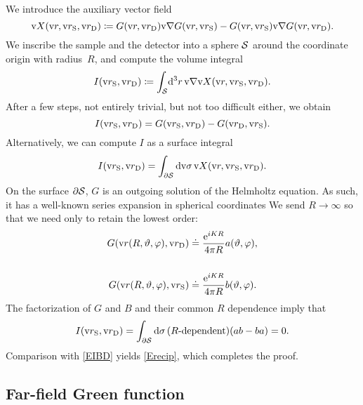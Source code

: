 We introduce the auxiliary vector field
\begin{equation}
  \text{v}{X}(\text{v}{r},\text{v}{r}_\text{S},\text{v}{r}_\text{D})\coloneqq G(\text{v}{r},\text{v}{r}_\text{D})\text{v}{\nabla} G(\text{v}{r},\text{v}{r}_\text{S}) - G(\text{v}{r},\text{v}{r}_\text{S})\text{v}{\nabla} G(\text{v}{r},\text{v}{r}_\text{D}).
\end{equation}
We inscribe the sample and the detector
into a sphere $\mathcal{S}$ around the coordinate origin with radius~$R$,
and compute the volume integral
\begin{equation}\label{Eprerecipro}
    I(\text{v}{r}_\text{S},\text{v}{r}_\text{D}) \coloneqq \displaystyle\int_{\mathcal{S}}\!\mathrm d^3r\,\text{v}{\nabla} \text{v}{X}(\text{v}{r},\text{v}{r}_\text{S},\text{v}{r}_\text{D}).
\end{equation}
After a few steps, not entirely trivial, but not too difficult either,
we obtain
\begin{equation}\label{EIBD}
  I(\text{v}{r}_\text{S},\text{v}{r}_\text{D}) = G(\text{v}{r}_\text{S},\text{v}{r}_\text{D}) - G(\text{v}{r}_\text{D},\text{v}{r}_\text{S}).
\end{equation}
Alternatively, we can compute $I$ as a surface integral
\begin{equation}
  I(\text{v}{r}_\text{S},\text{v}{r}_\text{D})
  =\displaystyle\int_{\partial\mathcal{S}}\mathrm d\text{v}{\sigma}\,\text{v}{X}(\text{v}{r},\text{v}{r}_\text{S},\text{v}{r}_\text{D}).
\end{equation}
On the surface $\partial\mathcal{S}$,
$G$ is an outgoing solution of the Helmholtz equation.
As such, it has a well-known series expansion in spherical coordinates
We send $R\to\infty$ so that we need only to retain the lowest order:
\begin{align}
   G(\text{v}{r}(R,\vartheta,\varphi),\text{v}{r}_\text{D})
   &\doteq\displaystyle \frac{\mathrm e^{iKR}}{4\pi R} a(\vartheta,\varphi),
   \\[3.8ex]
   G(\text{v}{r}(R,\vartheta,\varphi),\text{v}{r}_\text{S})
   &\doteq\displaystyle \frac{\mathrm e^{iKR}}{4\pi R} b(\vartheta,\varphi).
\end{align}
The factorization of $G$ and $B$ and their common $R$ dependence imply that
\begin{equation}
  I(\text{v}{r}_\text{S},\text{v}{r}_\text{D})
  =\displaystyle\int_{\partial\mathcal{S}}\mathrm d\sigma\,
       (\text{$R$-dependent})(ab-ba)
  = 0.
\end{equation}
Comparison with \cref{EIBD} yields \cref{Erecip},
which completes the proof.

%

\subsection{Far-field Green function}\label{SfarDW}

